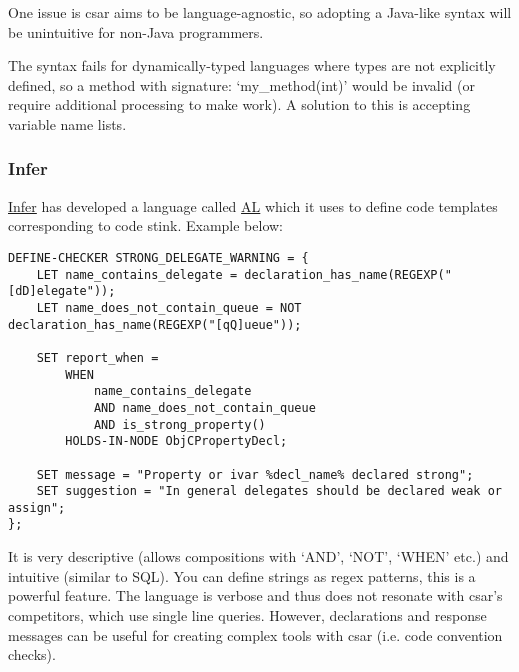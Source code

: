 \documentclass[12pt, letterpaper, oneside]{article}
\begin{document}
One issue is csar aims to be language-agnostic, so adopting a Java-like syntax will be unintuitive for non-Java programmers.

The syntax fails for dynamically-typed languages where types are not explicitly defined, so a method with signature: `my\_method(int)' would be invalid (or require additional processing to make work).
A solution to this is accepting variable name lists.

\subsubsection{Infer}
\href{https://github.com/facebook/infer}{Infer} has developed a language called \href{https://code.facebook.com/posts/277643589367408/}{AL} which it uses to define code templates corresponding to code stink. Example below:  

\begin{lstlisting}
DEFINE-CHECKER STRONG_DELEGATE_WARNING = {
    LET name_contains_delegate = declaration_has_name(REGEXP("[dD]elegate"));
    LET name_does_not_contain_queue = NOT declaration_has_name(REGEXP("[qQ]ueue"));

    SET report_when =
        WHEN
            name_contains_delegate
            AND name_does_not_contain_queue
            AND is_strong_property()
        HOLDS-IN-NODE ObjCPropertyDecl;

    SET message = "Property or ivar %decl_name% declared strong";
    SET suggestion = "In general delegates should be declared weak or assign";
};
\end{lstlisting}

It is very descriptive (allows compositions with `AND', `NOT', `WHEN' etc.) and intuitive (similar to SQL). You can define strings as regex patterns, this is a powerful feature.
The language is verbose and thus does not resonate with csar's competitors, which use single line queries.
However, declarations and response messages can be useful for creating complex tools with csar (i.e. code convention checks).
\end{document}
